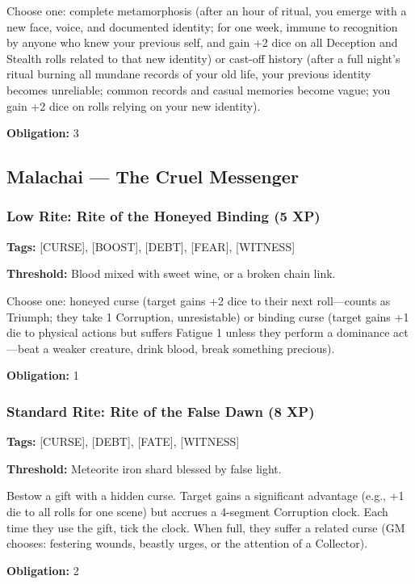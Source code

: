 Choose one: complete metamorphosis (after an hour of ritual, you emerge with a new face, voice, and documented identity; for one week, immune to recognition by anyone who knew your previous self, and gain +2 dice on all Deception and Stealth rolls related to that new identity) or cast-off history (after a full night's ritual burning all mundane records of your old life, your previous identity becomes unreliable; common records and casual memories become vague; you gain +2 dice on rolls relying on your new identity).

\textbf{Obligation:} 3

\subsection{Malachai — The Cruel Messenger}

\subsubsection{Low Rite: Rite of the Honeyed Binding (5 XP)}

\textbf{Tags:} [CURSE], [BOOST], [DEBT], [FEAR], [WITNESS]

\textbf{Threshold:} Blood mixed with sweet wine, or a broken chain link.

Choose one: honeyed curse (target gains +2 dice to their next roll—counts as Triumph; they take 1 Corruption, unresistable) or binding curse (target gains +1 die to physical actions but suffers Fatigue 1 unless they perform a dominance act—beat a weaker creature, drink blood, break something precious).

\textbf{Obligation:} 1

\subsubsection{Standard Rite: Rite of the False Dawn (8 XP)}

\textbf{Tags:} [CURSE], [DEBT], [FATE], [WITNESS]

\textbf{Threshold:} Meteorite iron shard blessed by false light.

Bestow a gift with a hidden curse. Target gains a significant advantage (e.g., +1 die to all rolls for one scene) but accrues a 4-segment Corruption clock. Each time they use the gift, tick the clock. When full, they suffer a related curse (GM chooses: festering wounds, beastly urges, or the attention of a Collector).

\textbf{Obligation:} 2

